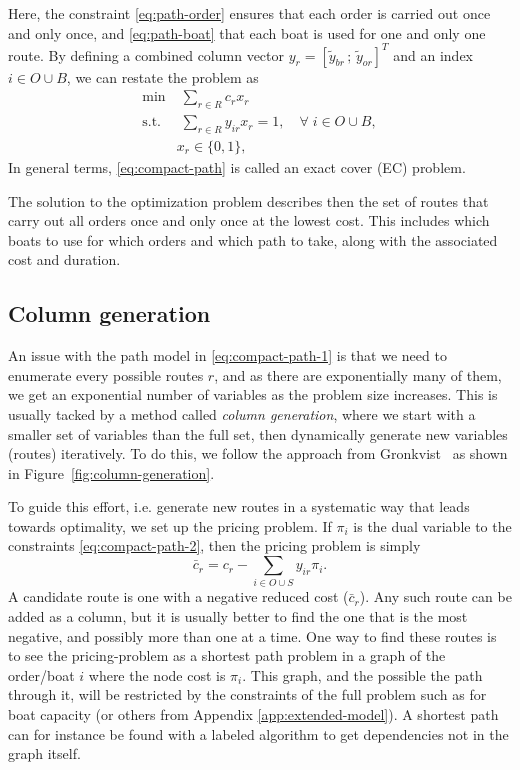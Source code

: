 \documentclass{article}
\begin{document}
Here, the constraint \eqref{eq:path-order} ensures that each order is carried out once and only once, and \eqref{eq:path-boat} that each boat is used for one and only one route. By defining a combined column vector $y_r = [\tilde{y}_{br} \, ; \, \tilde{y}_{or}]^T$ and an index $i \in O \cup B$, we can restate the problem as
\begin{subequations}
    \begin{align}
      \text{min}& \; \sum_{r \in R} c_r x_r \label{eq:compact-path-1}\\
      \text{s.t.}& \; \sum_{r \in R} y_{ir} x_r = 1, \hspace{1em} \forall \; i \in O \cup B, \label{eq:compact-path-2} \\
      &x_r \in \{0, 1\}, \label{eq:compact-path-3}
    \end{align}
    \label{eq:compact-path}
\end{subequations}
In general terms, \eqref{eq:compact-path} is called an exact cover (EC) problem.

The solution to the optimization problem describes then the set of routes that carry out all orders once and only once at the lowest cost. This includes which boats to use for which orders and which path to take, along with the associated cost and duration. 


\subsection{Column generation}

An issue with the path model in \eqref{eq:compact-path-1} is that we need to enumerate
every possible routes $r$, and as there are exponentially many of them, we get
an exponential number of variables as the problem size increases. This is
usually tacked by a method called \emph{column generation}, where we start with
a smaller set of variables than the full set, then dynamically generate new
variables (routes) iteratively. To do this, we follow the approach from Gronkvist~\cite{gronkvist_phdthesis} as shown in Figure~\ref{fig:column-generation}.

To guide this effort, i.e. generate new routes in a systematic way that leads
towards optimality, we set up the pricing problem. If $\pi_i$ is the dual
variable to the constraints \eqref{eq:compact-path-2}, then the pricing problem is simply
%
\begin{equation}
  \bar{c}_r = c_r - \sum_{i \in O \cup S} y_{ir} \pi_i.
  \label{eq:pricing-problem}
\end{equation}
%
A candidate route is one with a negative reduced cost ($\bar{c}_r$). Any such
route can be added as a column, but it is usually better to find the one that is
the most negative, and possibly more than one at a time. One way to find these
routes is to see the pricing-problem as a shortest path problem in a graph of
the order/boat $i$ where the node cost is $\pi_i$. This graph, and the possible
the path through it, will be restricted by the constraints of the full problem  such as for boat capacity (or others from Appendix \ref{app:extended-model}).
A shortest path can for instance be found with a labeled
algorithm to get dependencies not in the graph itself.
\end{document}
